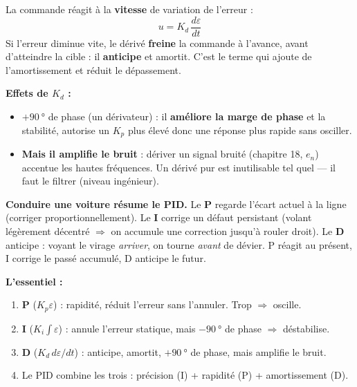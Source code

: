 \documentclass[12pt,a4paper,twoside]{book}
\begin{document}
\begin{formule}
La commande réagit à la \textbf{vitesse} de variation de l'erreur :
\[
u = K_d\,\frac{d\varepsilon}{dt}
\]
Si l'erreur diminue vite, le dérivé \textbf{freine} la commande à l'avance, avant d'atteindre la cible : il \textbf{anticipe} et amortit. C'est le terme qui ajoute de l'amortissement et réduit le dépassement.

\textbf{Effets de $K_d$ :}
\begin{itemize}[nosep]
\item $+\SI{90}{°}$ de phase (un dérivateur) : il \textbf{améliore la marge de phase} et la stabilité, autorise un $K_p$ plus élevé donc une réponse plus rapide sans osciller.
\item \textbf{Mais il amplifie le bruit} : dériver un signal bruité (chapitre 18, $e_n$) accentue les hautes fréquences. Un dérivé pur est inutilisable tel quel --- il faut le filtrer (niveau ingénieur).
\end{itemize}
\end{formule}

\begin{intuition}
\textbf{Conduire une voiture résume le PID.} Le \textbf{P} regarde l'écart actuel à la ligne (corriger proportionnellement). Le \textbf{I} corrige un défaut persistant (volant légèrement décentré $\Rightarrow$ on accumule une correction jusqu'à rouler droit). Le \textbf{D} anticipe : voyant le virage \textit{arriver}, on tourne \textit{avant} de dévier. P réagit au présent, I corrige le passé accumulé, D anticipe le futur.
\end{intuition}

\begin{retenir}
\textbf{L'essentiel :}
\begin{enumerate}[nosep]
\item \textbf{P} ($K_p\varepsilon$) : rapidité, réduit l'erreur sans l'annuler. Trop $\Rightarrow$ oscille.
\item \textbf{I} ($K_i\!\int\!\varepsilon$) : annule l'erreur statique, mais $-\SI{90}{°}$ de phase $\Rightarrow$ déstabilise.
\item \textbf{D} ($K_d\,d\varepsilon/dt$) : anticipe, amortit, $+\SI{90}{°}$ de phase, mais amplifie le bruit.
\item Le PID combine les trois : précision (I) + rapidité (P) + amortissement (D).
\end{enumerate}
\end{retenir}

\end{document}
